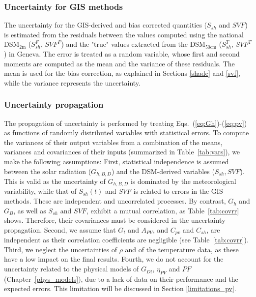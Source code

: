 \subsubsection{Uncertainty for GIS methods}

The uncertainty for the GIS-derived and bias corrected quantities ($S_{sh}$ and $\mathit{SVF}$) is estimated from the residuals between the values computed using the national DSM$_{2\text{m}}$ ($S_{sh}^F$, $\mathit{SVF}^F$) and the "true" values extracted from the DSM$_{50\text{cm}}$ ($S_{sh}^T$, $\mathit{SVF}^T$) in Geneva.
The error is treated as a random variable, whose first and second moments are computed as the mean and the variance of these residuals. The mean is used for the bias correction, as explained in Sections \ref{shade} and \ref{svf}, while the variance represents the uncertainty.

\subsubsection{Uncertainty propagation}
\label{unc_prop}

The propagation of uncertainty is performed by treating Eqs.~(\ref{eq:Gh})-(\ref{eq:pv}) as functions of randomly distributed variables with statistical errors. 
To compute the variances of their output variables from a combination of the means, variances and covariances of their inputs (summarized in Table~\ref{tab:vars}), we make the following assumptions:
First, statistical independence is assumed between the solar radiation ($G_{h, B, D}$) and the DSM-derived variables ($S_{sh}, \mathit{SVF}$). 
This is valid as the uncertainty of $G_{h, B, D}$ is dominated by the meteorological variability, while that of $S_{sh}(t)$ and $\mathit{SVF}$ is related to errors in the GIS methods. These are independent and uncorrelated processes. 
By contrast, $G_h$ and $G_B$, as well as $S_{sh}$ and $\mathit{SVF}$, exhibit a mutual correlation, as Table~\ref{tab:covrr} shows. Therefore, their covariances must be considered in the uncertainty propagation. 
Second, we assume that $G_t$ and $A_{PV}$, and $C_{\mathit{pv}}$ and $C_{sh}$, are independent as their correlation coefficients are negligible (see Table~\ref{tab:covrr}).
Third, we neglect the uncertainties of $\rho$ and of the temperature data, as these have a low impact on the final results.
Fourth, we do not account for the uncertainty related to the physical models of $G_{Dt}$, $\eta_{PV}$ and $\mathit{PF}$ (Chapter~\ref{phys_models}), due to a lack of data on their performance and the expected errors. This limitation will be discussed in Section \ref{limitations_pv}.

